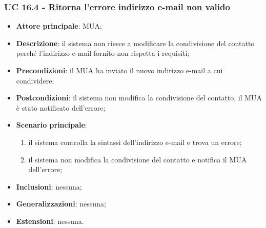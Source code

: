     \subsubsection{UC 16.4 - Ritorna l'errore indirizzo e-mail non valido} \label{sec:UC16.4}
    \begin{itemize}
        \item \textbf{Attore principale}: MUA;
        \item \textbf{Descrizione}: il sistema non riesce a modificare la condivisione del contatto perché l'indirizzo e-mail fornito non rispetta i requisiti;
        \item \textbf{Precondizioni}: il MUA ha inviato il nuovo indirizzo e-mail a cui condividere;
        \item \textbf{Postcondizioni}: il sistema non modifica la condivisione del contatto, il MUA è stato notificato dell'errore;
        \item \textbf{Scenario principale}:
            \begin{enumerate}
                \item il sistema controlla la sintassi dell'indirizzo e-mail e trova un errore;
                \item il sistema non modifica la condivisione del contatto e notifica il MUA dell'errore;
            \end{enumerate}
        \item \textbf{Inclusioni}: nessuna;
        \item \textbf{Generalizzazioni}: nessuna;
        \item \textbf{Estensioni}: nessuna.
    \end{itemize}
